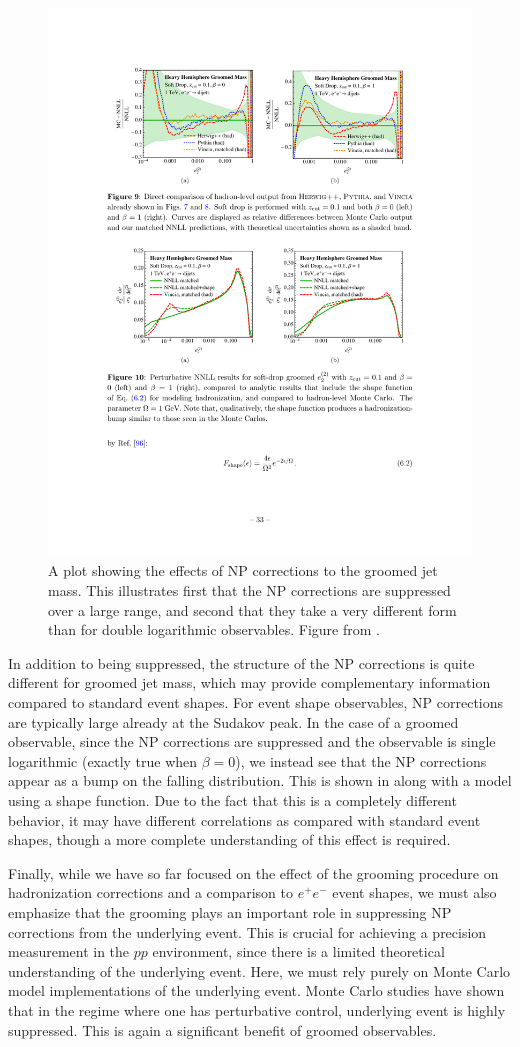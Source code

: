 \begin{figure}[t]
\begin{center}
\includegraphics[width = 0.6\columnwidth]{figures/shape_function.pdf}
\end{center}
\caption{A plot showing the effects of NP corrections to the groomed jet mass. This illustrates first that the NP corrections are suppressed over a large range, and second that they take a very different form than for double logarithmic observables. Figure from .}
\label{fig:shape_function}
\end{figure}

In addition to being suppressed, the structure of the NP corrections is quite different for groomed jet mass, which may provide complementary information compared to standard event shapes.
%
For event shape observables, NP corrections are typically large already at the Sudakov peak.
%
In the case of a groomed observable, since the NP corrections are suppressed and the observable is single logarithmic (exactly true when $\beta=0$), we instead see that the NP corrections appear as a bump on the falling distribution.
%
This is shown in  along with a model using a shape function.
%
Due to the fact that this is a completely different behavior, it may have different correlations as compared with standard event shapes, though a more complete understanding of this effect is required. 

Finally, while we have so far focused on the effect of the grooming procedure on hadronization corrections and a comparison to $e^+e^-$ event shapes, we must also emphasize that the grooming plays an important role in suppressing NP corrections from the underlying event.
%
This is crucial for achieving a precision measurement in the $pp$ environment, since there is a limited theoretical understanding of the underlying event.
%
Here, we must rely purely on Monte Carlo model implementations of the underlying event.
%
Monte Carlo studies have shown that in the regime where one has perturbative control, underlying event is highly suppressed.
%
This is again a significant benefit of groomed observables. 


